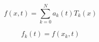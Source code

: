 \documentclass[12pt]{article}
\begin{document}
\begin{equation}
	f(x,t)=\sum_{k=0}^N a_k(t) T_k(x)
\end{equation}

\begin{equation}
	f_k(t)=f(x_k,t)
\end{equation}
\end{document}
